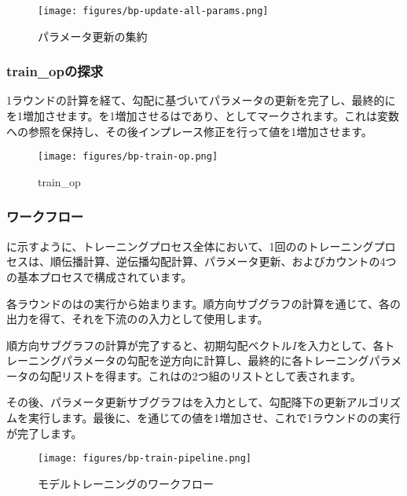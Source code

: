 \begin{content}
\begin{figure}[!h]
\centering
\texttt{[image: figures/bp-update-all-params.png]}
\caption{パラメータ更新の集約}
 \label{fig:bp-update-all-params}
\end{figure}

\subsubsection{train\_opの探求}

1ラウンドの計算を経て、勾配に基づいてパラメータの更新を完了し、最終的にを1増加させます。を1増加させるはであり、としてマークされます。これは変数への参照を保持し、その後インプレース修正を行って値を1増加させます。

\begin{figure}[!h]
\centering
\texttt{[image: figures/bp-train-op.png]}
\caption{train\_op}
 \label{fig:bp-train-op}
\end{figure}

\subsubsection{ワークフロー}

に示すように、トレーニングプロセス全体において、1回ののトレーニングプロセスは、順伝播計算、逆伝播勾配計算、パラメータ更新、およびカウントの4つの基本プロセスで構成されています。

各ラウンドのはの実行から始まります。順方向サブグラフの計算を通じて、各の出力を得て、それを下流のの入力として使用します。

順方向サブグラフの計算が完了すると、初期勾配ベクトル$ I $を入力として、各トレーニングパラメータの勾配を逆方向に計算し、最終的に各トレーニングパラメータの勾配リストを得ます。これはの2つ組のリストとして表されます。

その後、パラメータ更新サブグラフはを入力として、勾配降下の更新アルゴリズムを実行します。最後に、を通じての値を1増加させ、これで1ラウンドのの実行が完了します。

\begin{figure}[!h]
\centering
\texttt{[image: figures/bp-train-pipeline.png]}
\caption{モデルトレーニングのワークフロー}
 \label{fig:bp-train-pipeline}
\end{figure}

\end{content}
